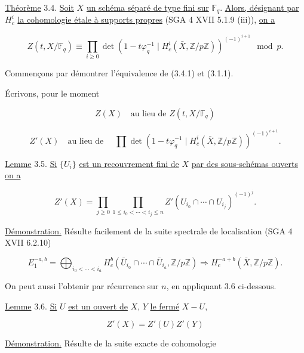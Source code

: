 
\underline{Théorème} 3.4. \underline{Soit} $X$ \underline{un schéma séparé de
type fini sur} $\mathbb F_q$. \underline{Alors, désignant par} $H_c^i$ \underline{la cohomologie
étale à supports propres} (SGA 4 XVII 5.1.9 (iii)), \underline{on a}

\begin{equation}\tag{3.4.1}
Z(t,X/\mathbb F_q)
\equiv
\prod_{i\geq0}
\det\!\left(1-t\varphi_q^{-1}\mid
H_c^i(\bar X,\mathbb Z/p\mathbb Z)\right)^{(-1)^{i+1}}
\mod p.
\end{equation}

Commençons par démontrer l'équivalence de (3.4.1) et (3.1.1).

Écrivons, pour le moment

\begin{equation}\tag{3.4.2}
Z(X)\quad\text{au lieu de }Z(t,X/\mathbb F_q)
\end{equation}

\begin{equation}\tag{3.4.3}
Z'(X)\quad\text{au lieu de }\quad
\prod\det\!\left(1-t\varphi_q^{-1}\mid
H_c^i(\bar X,\mathbb Z/p\mathbb Z)\right)^{(-1)^{i+1}}.
\end{equation}

\underline{Lemme} 3.5. \underline{Si} $\{U_i\}$ \underline{est un recouvrement fini de}
$X$ \underline{par des sous-schémas ouverts on a}

\begin{equation}\tag{3.5.1}
Z'(X)=
\prod_{j\geq0}
\prod_{1\leq i_0<\cdots<i_j\leq n}
Z'(U_{i_0}\cap\cdots\cap U_{i_j})^{(-1)^j}.
\end{equation}

\underline{Démonstration.} Résulte facilement de la suite spectrale de
localisation (SGA 4 XVII 6.2.10)

\[
E_1^{-a,b}=\bigoplus_{i_0<\cdots<i_a}
H_c^b(\bar U_{i_0}\cap\cdots\cap\bar U_{i_a},\mathbb Z/p\mathbb Z)
\Longrightarrow H_c^{-a+b}(\bar X,\mathbb Z/p\mathbb Z).
\]

On peut aussi l'obtenir par récurrence sur $n$, en appliquant 3.6 ci-dessous.

\underline{Lemme} 3.6. \underline{Si} $U$ \underline{est un ouvert de} $X$, $Y$ \underline{le fermé}
$X-U$,

\begin{equation}\tag{3.6.1}
Z'(X)=Z'(U)Z'(Y)
\end{equation}

\underline{Démonstration.} Résulte de la suite exacte de cohomologie

